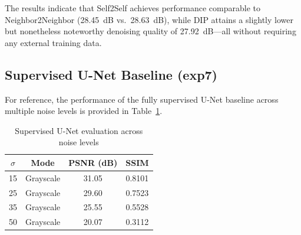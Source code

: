\documentclass[twocolumn, a4paper, 10pt]{article}
\begin{document}
\begin{table}[htbp]
\caption{Comparison with all methods on grayscale images ($\sigma=25$)}
\begin{center}
\label{tab:comparison}
\end{center}
\end{table}

The results indicate that Self2Self achieves performance comparable to Neighbor2Neighbor (28.45~dB vs.\ 28.63~dB), while DIP attains a slightly lower but nonetheless noteworthy denoising quality of 27.92~dB---all without requiring any external training data.

\subsection{Supervised U-Net Baseline (exp7)}

For reference, the performance of the fully supervised U-Net baseline across multiple noise levels is provided in Table~\ref{tab:unet}.

\begin{table}[htbp]
\caption{Supervised U-Net evaluation across noise levels}
\begin{center}
\begin{tabular}{cccc}
\toprule
\textbf{$\sigma$} & \textbf{Mode} & \textbf{PSNR (dB)} & \textbf{SSIM} \\
\midrule
15 & Grayscale & 31.05 & 0.8101 \\
25 & Grayscale & 29.60 & 0.7523 \\
35 & Grayscale & 25.55 & 0.5528 \\
50 & Grayscale & 20.07 & 0.3112 \\
\bottomrule
\end{tabular}
\label{tab:unet}
\end{center}
\end{table}
\end{document}
